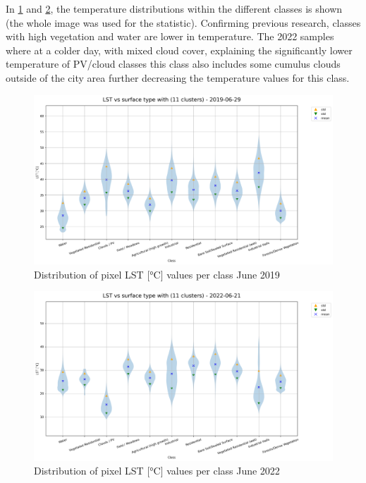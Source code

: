 \documentclass[12pt,a4paper, english,twoside]{scrartcl}
\begin{document}
      In \cref{fig:lstclusters19} and \cref{fig:lstclusters22}, the temperature distributions within the different classes is shown (the whole image was used for the statistic). 
      Confirming previous research, classes with high vegetation and water are lower in temperature. 
      The 2022 samples where at a colder day, with mixed cloud cover, explaining the significantly lower temperature of PV/cloud classes this class also includes some cumulus clouds outside of the city area further decreasing the temperature values for this class. 


       \begin{landscape}
         \begin{figure}[!p]
           \centering
           \includegraphics[width=0.91\linewidth]{img/LST vs surface type with (11 clusters) - 2019-06-29.png}
           \caption{Distribution of pixel \gls{LST} [°C] values per class June 2019 \label{fig:lstclusters19}}
         \end{figure}

         \begin{figure}[!p]
           \centering
           \includegraphics[width=0.91\linewidth]{img/LST vs surface type with (11 clusters) - 2022-06-21.png}
           \caption{Distribution of pixel \gls{LST} [°C] values per class June 2022 \label{fig:lstclusters22}}
         \end{figure}
       \end{landscape}
\end{document}
